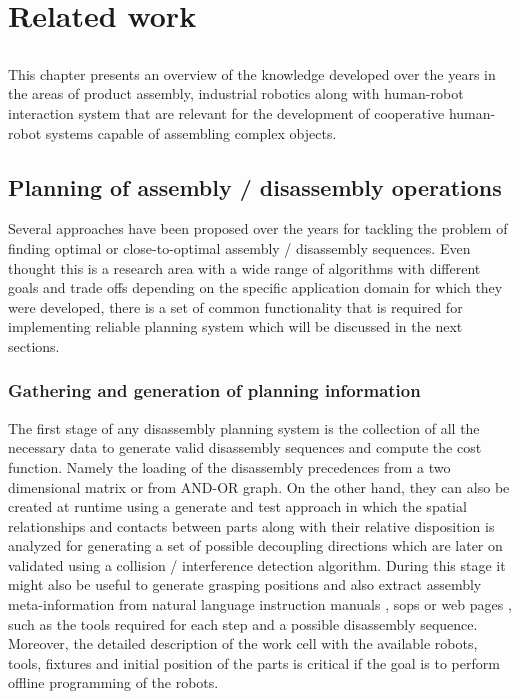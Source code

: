 \chapter{Related work}\label{chap:related-work}

\section*{}

This chapter presents an overview of the knowledge developed over the years in the areas of product assembly, industrial robotics along with human-robot interaction system that are relevant for the development of cooperative human-robot systems capable of assembling complex objects.




\section{Planning of assembly / disassembly operations}

Several approaches have been proposed over the years for tackling the problem of finding optimal or close-to-optimal assembly / disassembly sequences. Even thought this is a research area with a wide range of algorithms with different goals and trade offs depending on the specific application domain for which they were developed, there is a set of common functionality that is required for implementing reliable planning system which will be discussed in the next sections.



\subsection{Gathering and generation of planning information}

The first stage of any disassembly planning system \cite{Whitney2004} is the collection of all the necessary data to generate valid disassembly sequences and compute the cost function. Namely the loading of the disassembly precedences from a two dimensional matrix or from AND-OR graph. On the other hand, they can also be created \cite{Pintzos2016} at runtime using a generate and test approach \cite{Kaufman1996,Halperin2000} in which the spatial relationships and contacts between parts \cite{Tang2008} along with their relative disposition is analyzed for generating a set of possible decoupling directions which are later on validated using a collision / interference detection algorithm. During this stage it might also be useful to generate grasping positions \cite{Thomas2015} and also extract assembly meta-information from natural language instruction manuals \cite{CostaICARSC2017}, \glspl{sop} \cite{Stenmark2013} or web pages \cite{Tenorth2010}, such as the tools required for each step and a possible disassembly sequence. Moreover, the detailed description of the work cell \cite{Thomas2001} with the available robots, tools, fixtures and initial position of the parts is critical if the goal is to perform offline programming of the robots.




